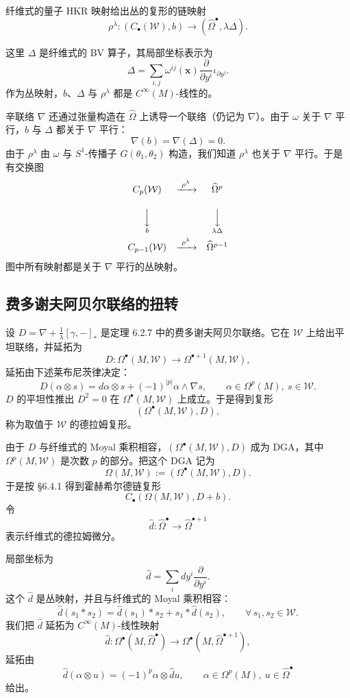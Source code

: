纤维式的量子 HKR 映射给出丛的复形的链映射
\[
\rho^\lambda:(C_\bullet(\mathcal W),b)
\longrightarrow(\widehat\Omega^\bullet,\lambda\Delta).
\]

这里 $\Delta$ 是纤维式的 BV 算子，其局部坐标表示为
\[
\Delta=\sum_{i,j}\omega^{ij}(\mathbf x)
\frac{\partial}{\partial y^i}\iota_{\partial y^j}.
\]
作为丛映射，$b$、$\Delta$ 与 $\rho^\lambda$ 都是 $C^\infty(M)$-线性的。

辛联络 $\nabla$ 还通过张量构造在 $\widehat\Omega$ 上诱导一个联络（仍记为 $\nabla$）。由于 $\omega$ 关于 $\nabla$ 平行，$b$ 与 $\Delta$ 都关于 $\nabla$ 平行：
\[
\nabla(b)=\nabla(\Delta)=0.
\]
由于 $\rho^\lambda$ 由 $\omega$ 与 $S^1$-传播子 $G(\theta_1,\theta_2)$ 构造，我们知道 $\rho^\lambda$ 也关于 $\nabla$ 平行。于是有交换图
\[
\begin{array}{ccc}
C_p(\mathcal W) & \xrightarrow{\ \rho^\lambda\ } & \widehat\Omega^p\\[14pt]
\underset{b}{\Big\downarrow} & & \underset{\lambda\Delta}{\Big\downarrow}\\[14pt]
C_{p-1}(\mathcal W) & \xrightarrow{\ \rho^\lambda\ } & \widehat\Omega^{p-1}
\end{array}
\]
图中所有映射都是关于 $\nabla$ 平行的丛映射。

\subsection{费多谢夫阿贝尔联络的扭转}

设 $D=\nabla+\frac1\lambda[\gamma,-]_\ast$ 是定理 6.2.7 中的费多谢夫阿贝尔联络。它在 $\mathcal W$ 上给出平坦联络，并延拓为
\[
D:\Omega^\bullet(M,\mathcal W)\longrightarrow\Omega^{\bullet+1}(M,\mathcal W),
\]
延拓由下述莱布尼茨律决定：
\[
D(\alpha\otimes s)=d\alpha\otimes s+(-1)^{|p|}\alpha\wedge\nabla s,
\qquad \alpha\in\Omega^p(M),\ s\in\mathcal W.
\]
$D$ 的平坦性推出 $D^2=0$ 在 $\Omega^\bullet(M,\mathcal W)$ 上成立。于是得到复形
\[
(\Omega^\bullet(M,\mathcal W),D),
\]
称为取值于 $\mathcal W$ 的德拉姆复形。

由于 $D$ 与纤维式的 Moyal 乘积相容，$(\Omega^\bullet(M,\mathcal W),D)$ 成为 DGA，其中 $\Omega^p(M,\mathcal W)$ 是次数 $p$ 的部分。把这个 DGA 记为
\[
\Omega(M,\mathcal W):=(\Omega^\bullet(M,\mathcal W),D).
\]
于是按 §6.4.1 得到霍赫希尔德链复形
\[
C_\bullet(\Omega(M,\mathcal W),D+b).
\]
令
\[
\widehat d:\widehat\Omega^\bullet\longrightarrow\widehat\Omega^{\bullet+1}
\]
表示纤维式的德拉姆微分。

局部坐标为
\[
\widehat d=\sum_i dy^i\frac{\partial}{\partial y^i}.
\]
这个 $\widehat d$ 是丛映射，并且与纤维式的 Moyal 乘积相容：
\[
\widehat d(s_1\ast s_2)=\widehat d(s_1)\ast s_2+s_1\ast\widehat d(s_2),
\qquad \forall\, s_1,s_2\in\mathcal W.
\]
我们把 $\widehat d$ 延拓为 $C^\infty(M)$-线性映射
\[
\widehat d:\Omega^\bullet(M,\widehat\Omega^\bullet)
\longrightarrow\Omega^\bullet(M,\widehat\Omega^{\bullet+1}),
\]
延拓由
\[
\widehat d(\alpha\otimes u)=(-1)^p\alpha\otimes\widehat du,
\qquad \alpha\in\Omega^p(M),\ u\in\widehat\Omega^\bullet
\]
给出。

